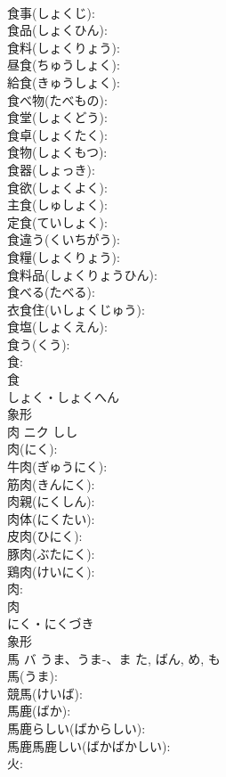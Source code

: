 \documentclass[8pt]{extreport}
\begin{document}
\begin{CJK}{UTF8}{min}
\\	食事(しょくじ): 
\\	食品(しょくひん): 
\\	食料(しょくりょう): 
\\	昼食(ちゅうしょく): 
\\	給食(きゅうしょく): 
\\	食べ物(たべもの): 
\\	食堂(しょくどう): 
\\	食卓(しょくたく): 
\\	食物(しょくもつ): 
\\	食器(しょっき): 
\\	食欲(しょくよく): 
\\	主食(しゅしょく): 
\\	定食(ていしょく): 
\\	食違う(くいちがう): 
\\	食糧(しょくりょう): 
\\	食料品(しょくりょうひん): 
\\	食べる(たべる): 
\\	衣食住(いしょくじゅう): 
\\	食塩(しょくえん): 
\\	食う(くう): 
\\	食: 
\\	食	
\\	しょく・しょくへん	
\\	象形 
\\	肉	ニク	しし		
\\	肉(にく): 
\\	牛肉(ぎゅうにく): 
\\	筋肉(きんにく): 
\\	肉親(にくしん): 
\\	肉体(にくたい): 
\\	皮肉(ひにく): 
\\	豚肉(ぶたにく): 
\\	鶏肉(けいにく): 
\\	肉: 
\\	肉	
\\	にく・にくづき	
\\	象形 
\\	馬	バ	うま、うま-、ま	た, ばん, め, も	
\\	馬(うま): 
\\	競馬(けいば): 
\\	馬鹿(ばか): 
\\	馬鹿らしい(ばからしい): 
\\	馬鹿馬鹿しい(ばかばかしい): 
\\	火: 

\end{CJK}
\end{document}
